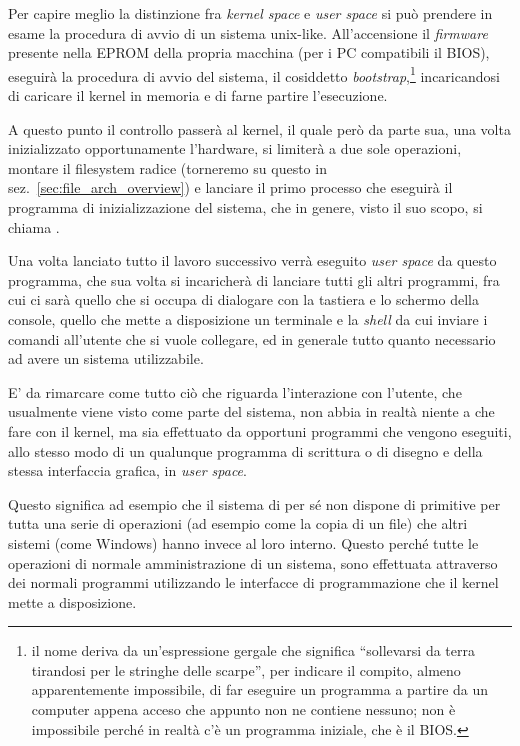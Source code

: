 Per capire meglio la distinzione fra \textit{kernel space} e \textit{user
  space} si può prendere in esame la procedura di avvio di un sistema
unix-like. All'accensione il \textit{firmware} presente nella EPROM della
propria macchina (per i PC compatibili il BIOS), eseguirà la procedura di
avvio del sistema, il cosiddetto \textit{bootstrap},\footnote{il nome deriva
  da un'espressione gergale che significa ``sollevarsi da terra tirandosi per
  le stringhe delle scarpe'', per indicare il compito, almeno apparentemente
  impossibile, di far eseguire un programma a partire da un computer appena
  acceso che appunto non ne contiene nessuno; non è impossibile perché in
  realtà c'è un programma iniziale, che è il BIOS.} incaricandosi di caricare
il kernel in memoria e di farne partire l'esecuzione. 

A questo punto il controllo passerà al kernel, il quale però da parte sua, una
volta inizializzato opportunamente l'hardware, si limiterà a due sole
operazioni, montare il filesystem radice (torneremo su questo in
sez.~\ref{sec:file_arch_overview}) e lanciare il primo processo che eseguirà
il programma di inizializzazione del sistema, che in genere, visto il suo
scopo, si chiama .

Una volta lanciato  tutto il lavoro successivo verrà eseguito
\textit{user space} da questo programma, che sua volta si incaricherà di
lanciare tutti gli altri programmi, fra cui ci sarà quello che si occupa di
dialogare con la tastiera e lo schermo della console, quello che mette a
disposizione un terminale e la \textit{shell} da cui inviare i comandi
all'utente che si vuole collegare, ed in generale tutto quanto necessario ad
avere un sistema utilizzabile.

E' da rimarcare come tutto ciò che riguarda l'interazione con l'utente, che
usualmente viene visto come parte del sistema, non abbia in realtà niente a
che fare con il kernel, ma sia effettuato da opportuni programmi che vengono
eseguiti, allo stesso modo di un qualunque programma di scrittura o di disegno
e della stessa interfaccia grafica, in \textit{user space}.

Questo significa ad esempio che il sistema di per sé non dispone di primitive
per tutta una serie di operazioni (ad esempio come la copia di un file) che
altri sistemi (come Windows) hanno invece al loro interno. Questo perché tutte
le operazioni di normale amministrazione di un sistema, sono effettuata
attraverso dei normali programmi utilizzando le interfacce di programmazione
che il kernel mette a disposizione.

